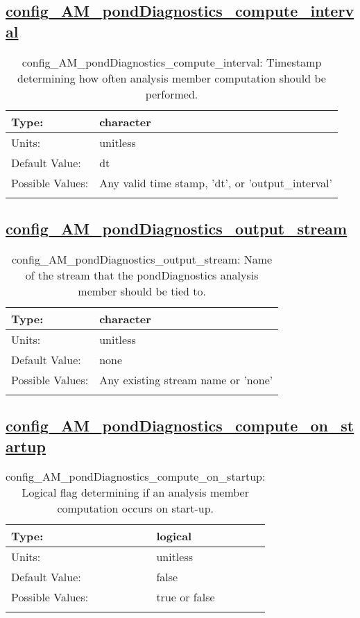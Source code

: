 \subsection[config\_AM\_pondDiagnostics\_compute\_interval]{\hyperref[sec:nm_tab_AM_pondDiagnostics]{config\_AM\_pondDiagnostics\_compute\_interval}}
\label{subsec:nm_sec_config_AM_pondDiagnostics_compute_interval}
\begin{center}
\begin{longtable}{| p{2.0in} || p{4.0in} |}
    \hline
    Type: & character \\
    \hline
    Units: & \si{unitless} \\
    \hline
    Default Value: & dt \\
    \hline
    Possible Values: & Any valid time stamp, 'dt', or 'output\_interval' \\
    \hline
    \caption{config\_AM\_pondDiagnostics\_compute\_interval: Timestamp determining how often analysis member computation should be performed.}
\end{longtable}
\end{center}
\subsection[config\_AM\_pondDiagnostics\_output\_stream]{\hyperref[sec:nm_tab_AM_pondDiagnostics]{config\_AM\_pondDiagnostics\_output\_stream}}
\label{subsec:nm_sec_config_AM_pondDiagnostics_output_stream}
\begin{center}
\begin{longtable}{| p{2.0in} || p{4.0in} |}
    \hline
    Type: & character \\
    \hline
    Units: & \si{unitless} \\
    \hline
    Default Value: & none \\
    \hline
    Possible Values: & Any existing stream name or 'none' \\
    \hline
    \caption{config\_AM\_pondDiagnostics\_output\_stream: Name of the stream that the pondDiagnostics analysis member should be tied to.}
\end{longtable}
\end{center}
\subsection[config\_AM\_pondDiagnostics\_compute\_on\_startup]{\hyperref[sec:nm_tab_AM_pondDiagnostics]{config\_AM\_pondDiagnostics\_compute\_on\_startup}}
\label{subsec:nm_sec_config_AM_pondDiagnostics_compute_on_startup}
\begin{center}
\begin{longtable}{| p{2.0in} || p{4.0in} |}
    \hline
    Type: & logical \\
    \hline
    Units: & \si{unitless} \\
    \hline
    Default Value: & false \\
    \hline
    Possible Values: & true or false \\
    \hline
    \caption{config\_AM\_pondDiagnostics\_compute\_on\_startup: Logical flag determining if an analysis member computation occurs on start-up.}
\end{longtable}
\end{center}
